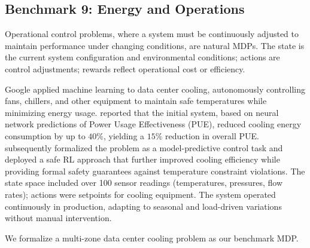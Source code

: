 \subsection{Benchmark 9: Energy and Operations}
\label{sec:benchmark_datacenter}

Operational control problems, where a system must be continuously adjusted to maintain performance under changing conditions, are natural MDPs. The state is the current system configuration and environmental conditions; actions are control adjustments; rewards reflect operational cost or efficiency.

Google applied machine learning to data center cooling, autonomously controlling fans, chillers, and other equipment to maintain safe temperatures while minimizing energy usage. \citet{Gao2014} reported that the initial system, based on neural network predictions of Power Usage Effectiveness (PUE), reduced cooling energy consumption by up to $40\%$, yielding a $15\%$ reduction in overall PUE. \citet{Lazic2018} subsequently formalized the problem as a model-predictive control task and deployed a safe RL approach that further improved cooling efficiency while providing formal safety guarantees against temperature constraint violations. The state space included over 100 sensor readings (temperatures, pressures, flow rates); actions were setpoints for cooling equipment. The system operated continuously in production, adapting to seasonal and load-driven variations without manual intervention.

We formalize a multi-zone data center cooling problem as our benchmark MDP.

